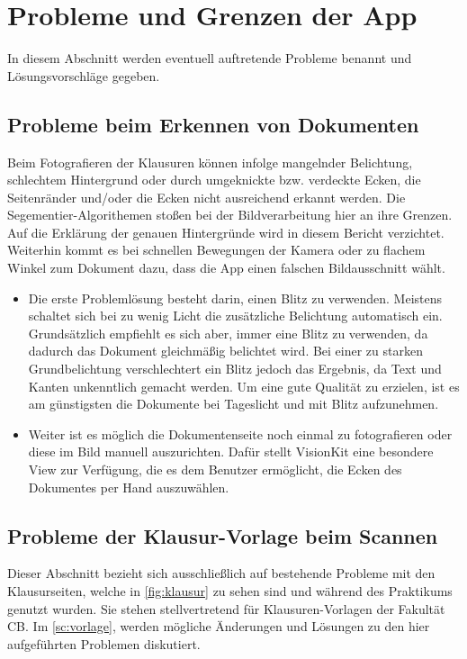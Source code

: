 \documentclass[notables, nomenclature, oneside, 150]{HSMW-Thesis}
\begin{document}
	\section{Probleme und Grenzen der App}\label{sc:grenzen}
		In diesem Abschnitt werden eventuell auftretende Probleme benannt und Lösungsvorschläge gegeben.

		\subsection{Probleme beim Erkennen von Dokumenten}\label{ssc:erkennen}
			Beim Fotografieren der Klausuren können infolge mangelnder Belichtung, schlechtem Hintergrund oder durch umgeknickte bzw. verdeckte Ecken, die Seitenränder und/oder die Ecken nicht ausreichend erkannt werden. Die Segementier-Algorithemen stoßen bei der Bildverarbeitung hier an ihre Grenzen. Auf die Erklärung der genauen Hintergründe wird in diesem Bericht verzichtet. Weiterhin kommt es bei schnellen Bewegungen der Kamera oder zu flachem Winkel zum Dokument dazu, dass die App einen falschen Bildausschnitt wählt.
			\vspace{-5mm}
			\begin{itemize}
				\item Die erste Problemlösung besteht darin, einen Blitz zu verwenden. Meistens schaltet sich bei zu wenig Licht die zusätzliche Belichtung automatisch ein. Grundsätzlich empfiehlt es sich aber, immer eine Blitz zu verwenden, da dadurch das Dokument gleichmäßig belichtet wird. Bei einer zu starken Grundbelichtung verschlechtert ein Blitz jedoch das Ergebnis, da Text und Kanten unkenntlich gemacht werden. Um eine gute Qualität zu erzielen, ist es am günstigsten die Dokumente bei Tageslicht und mit Blitz aufzunehmen. 
				\item Weiter ist es möglich die Dokumentenseite noch einmal zu fotografieren oder diese im Bild manuell auszurichten. Dafür stellt VisionKit eine besondere View zur Verfügung, die es dem Benutzer ermöglicht, die Ecken des Dokumentes per Hand auszuwählen.
			\end{itemize}
		
		\subsection{Probleme der Klausur-Vorlage beim Scannen}\label{ssc:problemevorlage}
			Dieser Abschnitt bezieht sich ausschließlich auf bestehende Probleme mit den Klausurseiten, welche in \autoref{fig:klausur} zu sehen sind und während des Praktikums genutzt wurden. Sie stehen stellvertretend für Klausuren-Vorlagen der Fakultät CB. Im \autoref{sc:vorlage}, werden mögliche Änderungen und Lösungen zu den hier aufgeführten Problemen diskutiert.
		
\end{document}
